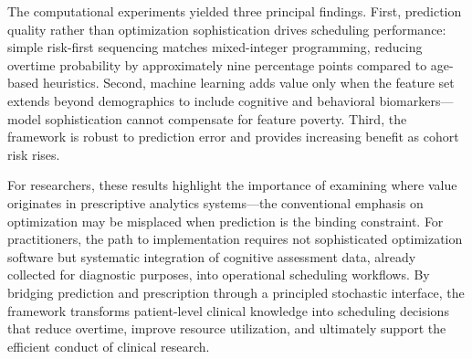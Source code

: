 \documentclass[11pt,a4paper]{article}
\begin{document}
The computational experiments yielded three principal findings. First, prediction quality rather than optimization sophistication drives scheduling performance: simple risk-first sequencing matches mixed-integer programming, reducing overtime probability by approximately nine percentage points compared to age-based heuristics. Second, machine learning adds value only when the feature set extends beyond demographics to include cognitive and behavioral biomarkers---model sophistication cannot compensate for feature poverty. Third, the framework is robust to prediction error and provides increasing benefit as cohort risk rises.

For researchers, these results highlight the importance of examining where value originates in prescriptive analytics systems---the conventional emphasis on optimization may be misplaced when prediction is the binding constraint. For practitioners, the path to implementation requires not sophisticated optimization software but systematic integration of cognitive assessment data, already collected for diagnostic purposes, into operational scheduling workflows. By bridging prediction and prescription through a principled stochastic interface, the framework transforms patient-level clinical knowledge into scheduling decisions that reduce overtime, improve resource utilization, and ultimately support the efficient conduct of clinical research.



\end{document}
